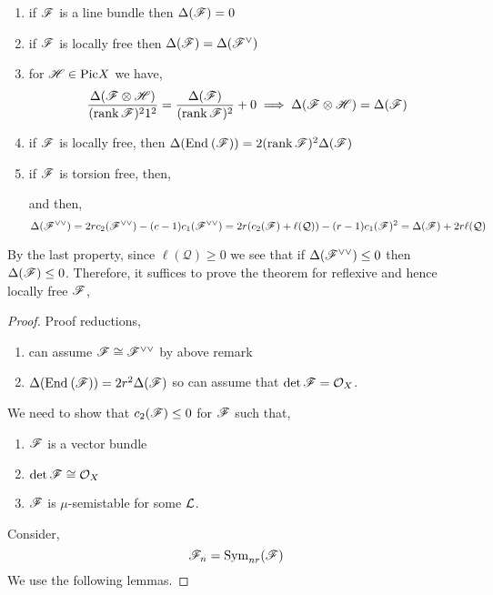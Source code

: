 \documentclass[12pt]{article}
\begin{document}
\begin{prop}
\begin{enumerate}
\item if $\mathscr{F}$ is a line bundle then $\Delta(\mathscr{F}) = 0$
\item if $\mathscr{F}$ is locally free then $\Delta(\mathscr{F}) = \Delta(\mathscr{F}^\vee)$ 
\item for $\mathscr{H} \in \mathrm{Pic}{X}$ we have,
\[ \frac{\Delta(\mathscr{F} \otimes \mathscr{H})}{(\operatorname{\mathrm{rank}}{\mathscr{F}})^2 1^2} = \frac{\Delta(\mathscr{F})}{(\operatorname{\mathrm{rank}}{\mathscr{F}})^2} + 0 \implies \Delta(\mathscr{F} \otimes \mathscr{H}) = \Delta(\mathscr{F}) \]
\item if $\mathscr{F}$ is locally free, then $\Delta(\mathrm{End}_{} \left( \mathscr{F} \right)) = 2 (\operatorname{\mathrm{rank}}{\mathscr{F}})^2 \Delta(\mathscr{F})$
\item if $\mathscr{F}$ is torsion free, then,
\begin{center}
\end{center}
and then,
\[ \Delta(\mathscr{F}^{\vee \vee}) = 2 r c_2(\mathscr{F}^{\vee \vee}) - (c-1) c_1(\mathscr{F}^{\vee \vee}) = 2 r (c_2(\mathscr{F}) + \ell(\mathcal{Q}))  - (r - 1) c_1(\mathscr{F})^2 = \Delta(\mathscr{F}) + 2 r \ell(\mathcal{Q}) \]
\end{enumerate}
\end{prop}

\begin{rmk}
By the last property, since $\ell(\mathcal{Q}) \ge 0$ we see that if $\Delta(\mathscr{F}^{\vee \vee}) \le 0$ then $\Delta(\mathscr{F}) \le 0$. Therefore, it suffices to prove the theorem for reflexive and hence locally free $\mathscr{F}$,
\end{rmk}

\begin{proof}
Proof reductions,
\begin{enumerate}
\item can assume $\mathscr{F} \cong \mathscr{F}^{\vee \vee}$ by above remark
\item $\Delta(\mathrm{End}_{} \left( \mathscr{F} \right)) = 2 r^2 \Delta(\mathscr{F})$ so can assume that $\det{\mathscr{F}} = \mathcal{O}_{X}$.
\end{enumerate}
We need to show that $c_2(\mathscr{F}) \le 0$ for $\mathscr{F}$ such that,
\begin{enumerate}
\item $\mathscr{F}$ is a vector bundle
\item $\det{\mathscr{F}} \cong \mathcal{O}_{X}$
\item $\mathscr{F}$ is $\mu$-semistable for some $\mathcal{L}$.
\end{enumerate}
Consider,
\[ \mathscr{F}_n = \mathrm{Sym}_{nr}\! \left( \mathscr{F} \right) \]
We use the following lemmas.
\end{proof}
\end{document}
